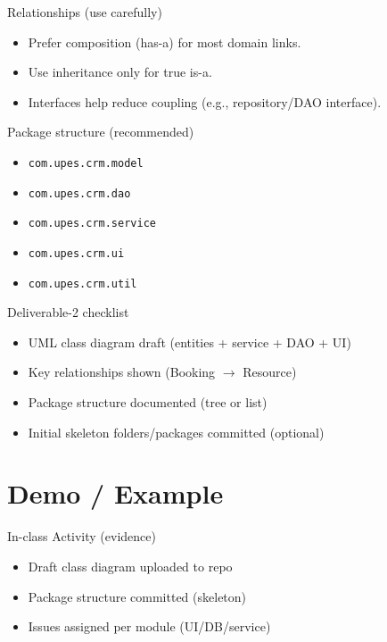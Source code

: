 \documentclass{beamer}
\begin{document}
\begin{frame}{Relationships (use carefully)}
  \begin{itemize}[<+->]
    \item Prefer composition (has-a) for most domain links.
    \item Use inheritance only for true is-a.
    \item Interfaces help reduce coupling (e.g., repository/DAO interface).
  \end{itemize}
  \slidesources{\OOPSUnitVISources}
\end{frame}

\begin{frame}{Package structure (recommended)}
  \begin{itemize}[<+->]
    \item \texttt{com.upes.crm.model}
    \item \texttt{com.upes.crm.dao}
    \item \texttt{com.upes.crm.service}
    \item \texttt{com.upes.crm.ui}
    \item \texttt{com.upes.crm.util}
  \end{itemize}
  \slidesources{\OOPSUnitVISources}
\end{frame}

\begin{frame}{Deliverable-2 checklist}
  \begin{itemize}[<+->]
    \item UML class diagram draft (entities + service + DAO + UI)
    \item Key relationships shown (Booking $\rightarrow$ Resource)
    \item Package structure documented (tree or list)
    \item Initial skeleton folders/packages committed (optional)
  \end{itemize}
  \slidesources{\OOPSUnitVISources}
\end{frame}


\section{Demo / Example}
\label{sec:demo}

\begin{frame}{In-class Activity (evidence)}
  \begin{itemize}[<+->]
    \item Draft class diagram uploaded to repo
    \item Package structure committed (skeleton)
    \item Issues assigned per module (UI/DB/service)
  \end{itemize}
  \slidesources{\OOPSUnitVISources}
\end{frame}
\end{document}
